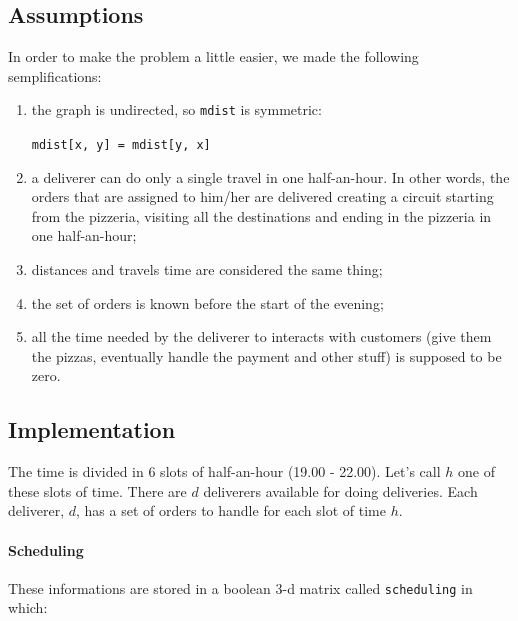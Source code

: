 \documentclass[10pt]{article}
\begin{document}
	\subsection{Assumptions}
	\label{subsec-assumptions}
	In order to make the problem a little easier, we made the following 
	semplifications:
	\begin{enumerate}
		\item the graph is undirected, so \texttt{mdist} is symmetric: 
		\begin{center}
			\texttt{mdist[x, y] = mdist[y, x]}
		\end{center} 
		\item a deliverer can do only a single travel in one half-an-hour. In other
			words, the orders that are assigned to him/her are delivered creating 
			a circuit starting from the pizzeria, visiting all the destinations 
			and ending in the pizzeria in one half-an-hour;
		\item distances and travels time are considered the same thing;
		\item the set of orders is known before the start of the evening;
		\item all the time needed by the deliverer to interacts with customers (give them the pizzas,
			eventually handle the payment and other stuff) is supposed to be zero. %
	\end{enumerate}

	\subsection{Implementation}


	
	The time is divided in 6 slots of half-an-hour (19.00 - 22.00). Let's call
	$h$ one of these slots of time.
	There are $d$ deliverers available for doing deliveries.
	Each deliverer, $d$, has a set of orders to handle for each slot of time $h$.

    \paragraph*{Scheduling}
	These informations are stored in a boolean 3-d matrix called 
	\texttt{scheduling} in which: 
	
\end{document}
